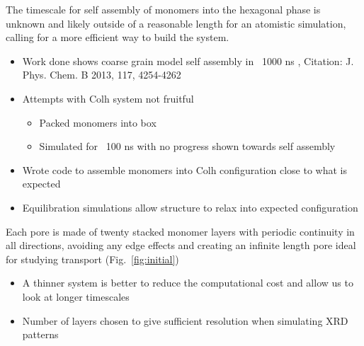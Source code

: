 \documentclass{article}
\begin{document}
	The timescale for self assembly of monomers into the hexagonal phase is unknown and likely outside of a reasonable length for an atomistic simulation, calling for a more efficient way to build the system. 
	\begin{itemize}
		\item Work done shows coarse grain model self assembly in ~1000 ns , Citation: J. Phys. Chem. B 2013, 117, 4254-4262
		\item Attempts with Colh system not fruitful  
		\begin{itemize}
			\item Packed monomers into box
			\item Simulated for ~100 ns with no progress shown towards self assembly
		\end{itemize}  
		\item Wrote code to assemble monomers into Colh configuration close to what is expected 
		\item Equilibration simulations allow structure to relax into expected configuration 
	\end{itemize}
	Each pore is made of twenty stacked monomer layers with periodic continuity in all directions, avoiding any edge effects and creating an infinite length pore ideal for studying transport (Fig.~\ref{fig:initial})
	\begin{itemize}
		\item A thinner system is better to reduce the computational cost and allow us to look at longer timescales
		\item Number of layers chosen to give sufficient resolution when simulating XRD patterns
	\end{itemize}
\end{document}
